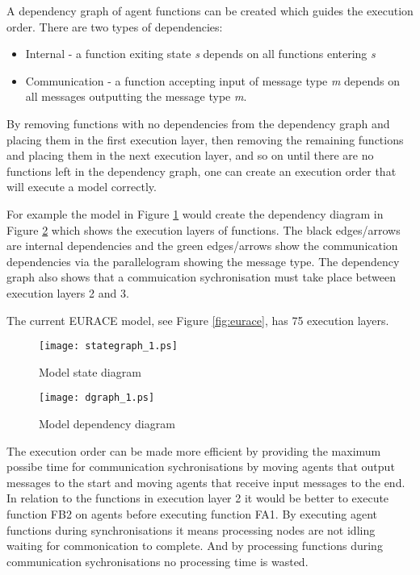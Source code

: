 \documentclass{aamas2009}
\begin{document}
A dependency graph of agent functions can be created which guides the execution
order. There are two types of dependencies:

\begin{itemize}
  \item Internal - a function exiting state \textit{s} depends on all functions
  entering \textit{s}
  \item Communication - a function accepting input of message type \textit{m}
  depends on all messages outputting the message type \textit{m}.
\end{itemize}

By removing functions with no dependencies from the dependency graph and placing
them in the first execution layer, then removing the remaining functions and
placing them in the next execution layer, and so on until there are no
functions left in the dependency graph, one can create an execution order that
will execute a model correctly.

For example the model in Figure \ref{fig:stategraph_1} would create the
dependency diagram in Figure \ref{fig:dgraph_1} which shows the execution
layers of functions. The black edges/arrows are internal dependencies and the
green edges/arrows show the communication dependencies via the parallelogram
showing the message type. The dependency graph also shows that a commuication
sychronisation must take place between execution layers 2 and 3.

The current EURACE model, see Figure \ref{fig:eurace}, has 75 execution layers.

\begin{figure}[hbp]
\centering
\texttt{[image: stategraph\_1.ps]}
\caption{Model state diagram}
\label{fig:stategraph_1}
\end{figure}

\begin{figure}[hbp]
\centering
\texttt{[image: dgraph\_1.ps]}
\caption{Model dependency diagram}
\label{fig:dgraph_1}
\end{figure}

The execution order can be made more efficient by providing the maximum possibe
time for communication sychronisations by moving agents that output messages to
the start and moving agents that receive input messages to the end. In relation
to the functions in execution layer 2 it would be better to execute function FB2
on agents before executing function FA1. By executing agent functions during
synchronisations it means processing nodes are not idling waiting for
commonication to complete.
And by processing functions during communication sychronisations no processing
time is wasted.
\end{document}
